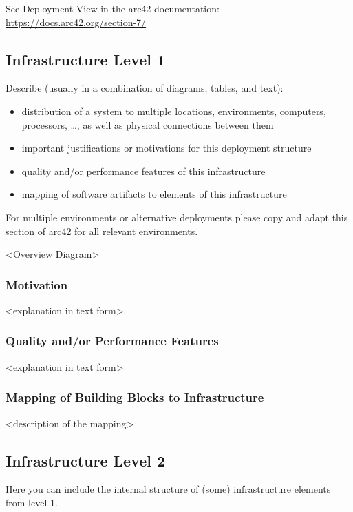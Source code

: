 See Deployment View in the arc42 documentation:
\href{https://docs.arc42.org/section-7/}{https://docs.arc42.org/section-7/}

\subsection{Infrastructure Level 1}

Describe (usually in a combination of diagrams, tables, and text):
\begin{itemize}
  \item distribution of a system to multiple locations, environments, computers, processors, \dots, as well as physical connections between them
  \item important justifications or motivations for this deployment structure
  \item quality and/or performance features of this infrastructure
  \item mapping of software artifacts to elements of this infrastructure
\end{itemize}

For multiple environments or alternative deployments please copy and adapt this section of arc42 for all relevant environments.

\textless Overview Diagram\textgreater

\subsubsection*{Motivation}
\textless explanation in text form\textgreater

\subsubsection*{Quality and/or Performance Features}
\textless explanation in text form\textgreater

\subsubsection*{Mapping of Building Blocks to Infrastructure}
\textless description of the mapping\textgreater

\subsection{Infrastructure Level 2}

Here you can include the internal structure of (some) infrastructure elements from level 1.

